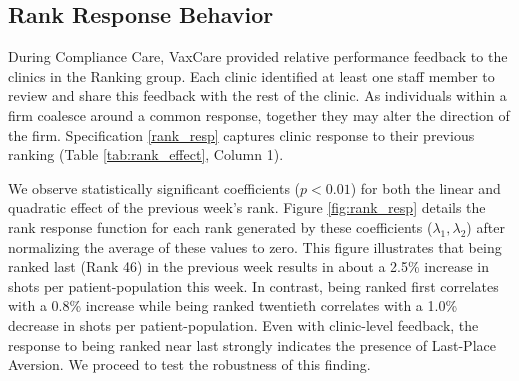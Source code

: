 \begin{onehalfspace}
 \subsection{Rank Response Behavior}
 During Compliance Care, VaxCare provided relative performance feedback to the clinics in the Ranking group. Each clinic identified at least one staff member to review and share this feedback with the rest of the clinic. As individuals within a firm coalesce around a common response, together they may alter the direction of the firm. Specification \ref{rank_resp} captures clinic response to their previous ranking (Table \ref{tab:rank_effect}, Column 1). 
 
 We observe statistically significant coefficients ($p < 0.01$) for both the linear and quadratic effect of the previous week’s rank. Figure \ref{fig:rank_resp} details the rank response function for each rank generated by these coefficients ($\lambda_1,\lambda_2$) after normalizing the average of these values to zero. This figure illustrates that being ranked last (Rank 46) in the previous week results in about a 2.5\% increase in shots per patient-population this week. In contrast, being ranked first correlates with a 0.8\% increase while being ranked twentieth correlates with a 1.0\% decrease in shots per patient-population. Even with clinic-level feedback, the response to being ranked near last strongly indicates the presence of Last-Place Aversion. We proceed to test the robustness of this finding.


\end{onehalfspace}
